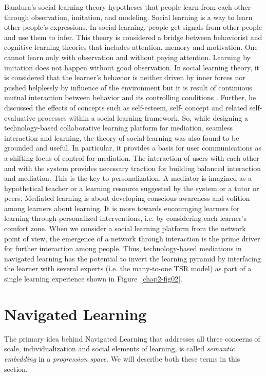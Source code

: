 \begin{multicols}{2}
Bandura’s \cite{art2-key06} social learning theory hypotheses that people learn from each other through observation, imitation, and modeling. Social learning is a way to learn other people’s expressions. In social learning, people get signals from other people and use them to infer. This theory is considered a bridge between behaviorist and cognitive learning theories that includes attention, memory and motivation. One cannot learn only with observation and without paying attention. Learning by imitation does not happen without good observation. In social learning theory, it is considered that the learner’s behavior is neither driven by inner forces nor pushed helplessly by influence of the environment but it is result of continuous mutual interaction between behavior and its controlling conditions \cite{art2-key06}. Further, he discussed the effects of concepts such as self-esteem, self- concept and related self-evaluative processes within a social learning framework. So, while designing a technology-based collaborative learning platform for mediation, seamless interaction and learning, the theory of social learning was also found to be grounded and useful. In particular, it provides a basis for user communications as a shifting locus of control for mediation. The interaction of users with each other and with the system provides necessary traction for building balanced interaction and mediation. This is the key to personalization. A mediator is imagined as a hypothetical teacher or a learning resource suggested by the system or a tutor or peers. Mediated learning is about developing conscious awareness and volition among learners about learning. It is more towards encouraging learners for learning through personalized interventions, i.e. by considering each learner’s comfort zone. When we consider a social learning platform from the network point of view, the emergence of a network through interaction is the prime driver for further interaction among people. Thus, technology-based mediations in navigated learning has the potential to invert the learning pyramid by interfacing the learner with several experts (i.e. the many-to-one TSR model) as part of a single learning experience shown in Figure~\ref{chap2-fig02}.

\section{Navigated Learning}

The primary idea behind Navigated Learning that addresses all three concerns of scale, individualization and social elements of learning, is called \textit{semantic embedding} in a \textit{progression space}. We will describe both these terms in this section.


\end{multicols}
